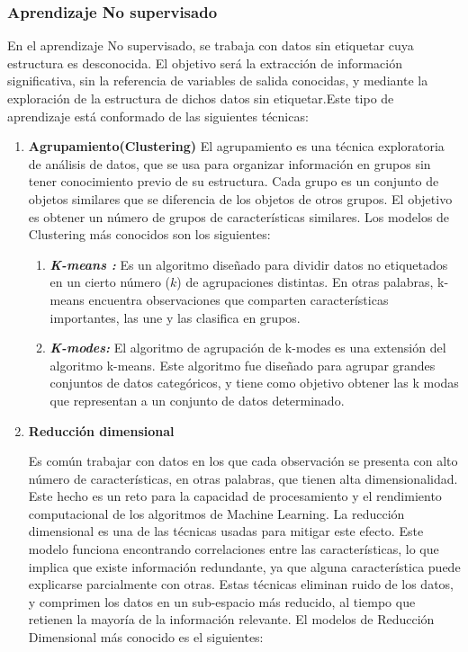 \subsubsection{Aprendizaje No supervisado}
En el aprendizaje No supervisado, se trabaja con datos sin etiquetar cuya estructura es desconocida. El objetivo será la extracción de información significativa, sin la referencia de variables de salida conocidas, y mediante la exploración de la estructura de dichos datos sin etiquetar\cite{BriegaLopez2015}.Este tipo de aprendizaje está conformado de las siguientes técnicas:
\begin{enumerate}[label=\textbf{\arabic*})]
	
	\item \textbf{Agrupamiento(Clustering)}
	El agrupamiento es una técnica exploratoria de análisis de datos, que se usa para organizar información en grupos sin tener conocimiento previo de su estructura. Cada grupo es un conjunto de objetos similares que se diferencia de los objetos de otros grupos. El objetivo es obtener un número de grupos de características similares\cite{BriegaLopez2015}. Los modelos de Clustering más conocidos son los siguientes:
	
	\begin{enumerate}[label=\textbf{(\alph*)}]
		\item \textit{\textbf{K-means :}}
		Es un algoritmo diseñado para dividir datos no etiquetados en un cierto número ($k$) de agrupaciones distintas. En otras palabras, k-means encuentra observaciones que comparten características importantes, las une y las clasifica en grupos\cite{Jeffares2019}. 
		
		\item \textit{\textbf{K-modes:}}
		El algoritmo de agrupación de k-modes es una extensión del algoritmo k-means. Este algoritmo fue diseñado para agrupar grandes conjuntos de datos categóricos, y tiene como objetivo obtener las k modas que representan a un conjunto de datos determinado\cite{Ramirez2020}.
	\end{enumerate}
	
	\item \textbf{Reducción dimensional}
	
	Es común trabajar con datos en los que cada observación se presenta con alto número de características, en otras palabras, que tienen alta dimensionalidad. Este hecho es un reto para la capacidad de procesamiento y el rendimiento computacional de los algoritmos de Machine Learning. La reducción dimensional es una de las técnicas usadas para mitigar este efecto. Este modelo funciona encontrando correlaciones entre las características, lo que implica que existe información redundante, ya que alguna característica puede explicarse parcialmente con otras. Estas técnicas eliminan ruido de los datos, y comprimen los datos en un sub-espacio más reducido, al tiempo que retienen la mayoría de la información relevante\cite{BriegaLopez2015}. El modelos de Reducción Dimensional más conocido es el siguientes:
	

\end{enumerate}
